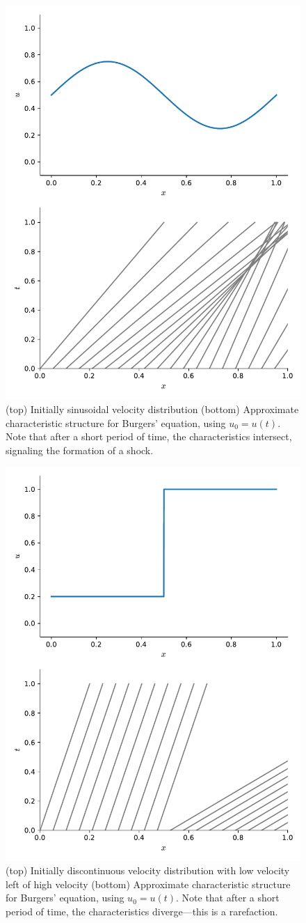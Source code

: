 \begin{figure}[t]
\centering
\includegraphics[width=0.6\linewidth]{burgers-characteristics}
\caption[Characteristics for shock initial conditions]
{\label{fig:burgers_char} (top) Initially sinusoidal
velocity distribution (bottom) Approximate characteristic
structure for Burgers' equation, using $u_0 = u(t)$.  Note that
after a short period of time, the characteristics intersect, signaling
the formation of a shock.}
\end{figure}

\begin{figure}[t]
\centering
\includegraphics[width=0.6\linewidth]{burgers-characteristics-rare}
\caption[Characteristics for rarefaction initial conditions]
        {\label{fig:burgers_char_rare} (top) Initially discontinuous
          velocity distribution with low velocity left of high
          velocity (bottom) Approximate characteristic structure for
          Burgers' equation, using $u_0 = u(t)$.  Note that after a
          short period of time, the characteristics diverge---this is 
          a rarefaction.}
\end{figure}



